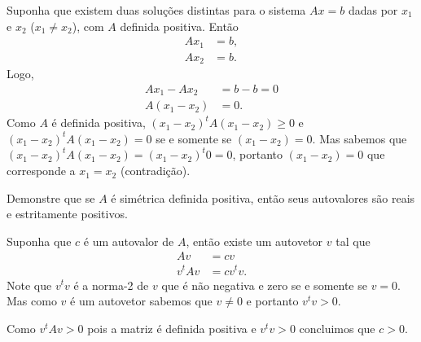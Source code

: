 \begin{questions}
\begin{solution}
        Suponha que existem duas solu\c{c}\~{o}es distintas para o sistema $A x = b$ dadas por $x_1$ e $x_2$ ($x_1 \neq x_2$), com $A$ definida positiva. Ent\~{a}o
        \begin{align*}
            A x_1 &= b, \\
            A x_2 &= b.
        \end{align*}
        Logo,
        \begin{align*}
            A x_1 - A x_2 &= b - b = 0 \\
            A (x_1 - x_2) &= 0.
        \end{align*}
        Como $A$ \'{e} definida positiva, $(x_1 - x_2)^t A (x_1 - x_2) \geq 0$ e $(x_1 - x_2)^t A (x_1 - x_2) = 0$ se e somente se $(x_1 - x_2) = 0$. Mas sabemos que $(x_1 - x_2)^t A (x_1 - x_2) = (x_1 - x_2)^t 0 = 0$, portanto $(x_1 - x_2) = 0$ que corresponde a $x_1 = x_2$ (contradi\c{c}\~{a}o).
    \end{solution}

    \question Demonstre que se $A$ \'{e} sim\'{e}trica definida positiva, ent\~{a}o seus autovalores s\~{a}o reais e estritamente positivos.
    \begin{solution}
        Suponha que $c$ \'{e} um autovalor de $A$, ent\~{a}o existe um autovetor $v$ tal que
        \begin{align*}
            A v &= c v \\
            v^t A v &= c v^t v.
        \end{align*}
        Note que $v^t v$ \'{e} a norma-2 de $v$ que \'{e} n\~{a}o negativa e zero se e somente se $v = 0$. Mas como $v$ \'{e} um autovetor sabemos que $v \neq 0$ e portanto $v^t v > 0$.

        Como $v^t A v > 0$ pois a matriz \'{e} definida positiva e $v^t v > 0$ concluimos que $c > 0$.
    \end{solution}


\end{questions}
